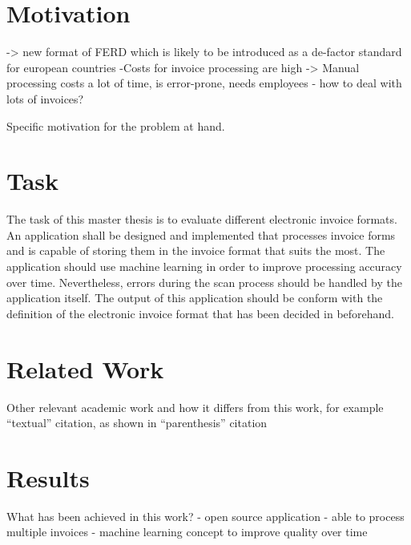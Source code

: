 
\section{Motivation}

-> new format of FERD which is likely to be introduced as a de-factor standard for european countries
-Costs for invoice processing are high
-> Manual processing costs a lot of time, is error-prone, needs employees
- how to deal with lots of invoices?

Specific motivation for the problem at hand. %


\section{Task}

The task of this master thesis is to evaluate different electronic invoice formats. An application shall be designed and implemented that processes invoice forms and is capable of storing them in the invoice format that suits the most.
The application should use machine learning in order to improve processing accuracy over time. Nevertheless, errors during the scan process should be handled by the application itself.
The output of this application should be conform with the definition of the electronic invoice format that has been decided in beforehand.



\section{Related Work}

Other relevant academic work and how it differs from this work, for
example %
``textual'' citation, as shown in %
``parenthesis'' citation %



\section{Results}

What has been achieved in this work? %
- open source application
- able to process multiple invoices
- machine learning concept to improve quality over time


